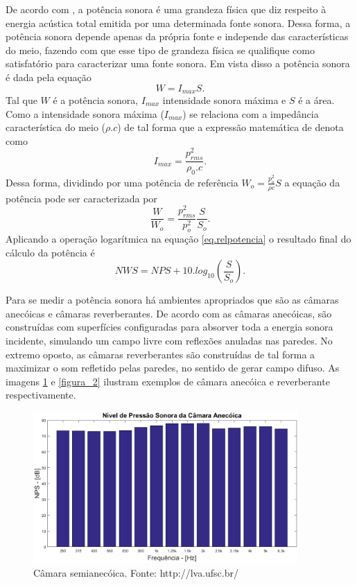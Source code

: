 De acordo com \cite{potencia}, a potência sonora é uma grandeza física que diz respeito à energia acústica total emitida por uma determinada fonte sonora. Dessa forma, a potência sonora depende apenas da própria fonte e independe das características do meio, fazendo com que esse tipo de grandeza física se qualifique como satisfatório para caracterizar uma fonte sonora. Em vista disso a potência sonora é dada pela equação
\begin{equation}
W = I_{max}S.
\label{eq.potencia}
\end{equation}
Tal que $W$ é a potência sonora, $I_{max}$ intensidade sonora máxima e $S$ é a área. Como a intensidade sonora máxima ($I_{max}$) se relaciona com a impedância característica do meio ($\rho . c$) de tal forma que a expressão matemática de denota como \begin{equation}
I_{max}=\frac{p_{rms}^{2}}{\rho_{0} . c}.
\label{eq.intensidade}
\end{equation}
Dessa forma, dividindo por uma potência de referência $W_{o}= \frac{p_{o}^{2}}{\rho c}S $ a equação da potência pode ser caracterizada por
 \begin{equation}
	\frac{W}{W_{o}}=\frac{p_{rms}^{2}}{p_{o}^{2}}\frac{S}{S_{o}}.
\label{eq.relpotencia}
\end{equation}
Aplicando a operação logarítmica na equação \ref{eq.relpotencia} o resultado final do cálculo da potência é
\begin{equation}
	NWS = NPS + 10 . log_{10}\left(\frac{S}{S_{o}}\right).
\end{equation}

Para se medir a potência sonora há ambientes apropriados que são as câmaras anecóicas e câmaras reverberantes. De acordo com \cite{bistafa} as câmaras anecóicas, são construídas com superfícies configuradas para absorver toda a energia sonora incidente, simulando um campo livre com reflexões anuladas nas paredes. No extremo oposto, as câmaras reverberantes são construídas de tal forma a maximizar o som refletido pelas paredes, no sentido de gerar campo difuso. As imagens \ref{figura_1} e \ref{figura_2} ilustram exemplos de câmara anecóica e reverberante respectivamente.

\begin{figure}[h!]
    \centering
    \includegraphics[width=0.9\textwidth]{figuras/P_anecoica.eps}
    \caption{Câmara semianecóica. Fonte: http://lva.ufsc.br/}
    \label{figura_1}
\end{figure}

